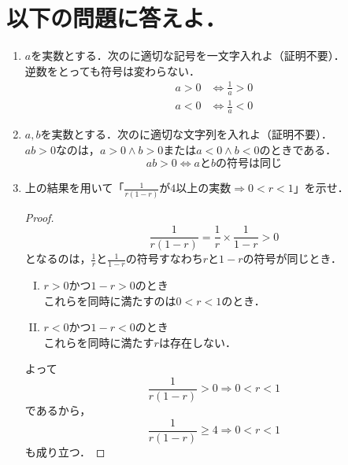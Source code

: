 \documentclass[a4paper,12pt]{ltjsarticle}
\begin{document}
\section{以下の問題に答えよ．}
\begin{enumerate}[(1)]
    \item $a$を実数とする．次の\square に適切な記号を一文字入れよ（証明不要）． \\
        逆数をとっても符号は変わらない．
        \begin{align*}
            a > 0 &\Leftrightarrow \frac{1}{a} > 0 \\
            a < 0 &\Leftrightarrow \frac{1}{a} < 0
        \end{align*}
    \item $a,b$を実数とする．次の\square に適切な文字列を入れよ（証明不要）． \\
        $ab > 0$なのは，$a > 0 \land b > 0$または$a < 0 \land b < 0$のときである．
        \begin{equation*}
            ab > 0 \Leftrightarrow a と b の符号は同じ
        \end{equation*}
    \item 上の結果を用いて「$\frac{1}{r(1 - r)}が4以上の実数 \Rightarrow 0 < r < 1$」を示せ．
        \begin{proof}
            \begin{equation*}
                \frac{1}{r(1 - r)} = \frac{1}{r} \times \frac{1}{1 - r} > 0
            \end{equation*}
            となるのは，$\frac{1}{r}$と$\frac{1}{1 - r}$の符号すなわち$r$と$1 - r$の符号が同じとき．
            \begin{enumerate}[(I)]
                \item $r > 0$かつ$1 - r > 0$のとき \\
                    これらを同時に満たすのは$0 < r < 1$のとき．
                \item $r < 0$かつ$1 - r < 0$のとき \\
                    これらを同時に満たす$r$は存在しない．
            \end{enumerate}
            よって
            \begin{equation*}
                \frac{1}{r(1 - r)} > 0 \Rightarrow 0 < r < 1
            \end{equation*}
            であるから，
            \begin{equation*}
                \frac{1}{r(1 - r)} \geq 4 \Rightarrow 0 < r < 1
            \end{equation*}
            も成り立つ．
        \end{proof}
\end{enumerate}
\end{document}
